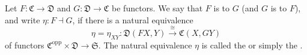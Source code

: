Let $F: \mathfrak{C} \to \mathfrak{D}$ and $G: \mathfrak{D} \to \mathfrak{C}$ be functors. We say that $F$ is  to $G$ (and $G$ is  to $F$), and write $\eta: F \dashv G$, if there is a natural equivalence
$$\eta = \eta_{XY}: \mathfrak{D}(FX, Y) \xrightarrow{\cong} \mathfrak{C}(X, GY)$$
of functors $\mathfrak{C}^{\text{opp}} \times \mathfrak{D} \to \mathfrak{S}$. The natural equivalence $\eta$ is called the  or simply the .
